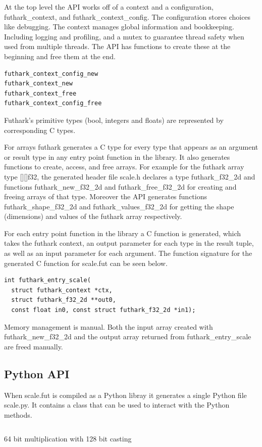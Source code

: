 \documentclass[11pt]{book}
\begin{document}
At the top level the API works off of a context and a configuration, futhark\_context, and futhark\_context\_config. The configuration stores choices like debugging. The context manages global information and bookkeeping. Including logging and profiling, and a mutex to guarantee thread safety when used from multiple threads. The API has functions to create these at the beginning and free them at the end. 
\begin{verbatim}
futhark_context_config_new
futhark_context_new
futhark_context_free
futhark_context_config_free
\end{verbatim}

Futhark's primitive types (bool, integers and floats) are represented by corresponding C types.

For arrays futhark generates a C type for every type that appears as an argument or result type in any entry point function in the library. It also generates functions to create, access, and free arrays. For example for the futhark array type [][]f32, the generated header file scale.h declares a type futhark\_f32\_2d and functions futhark\_new\_f32\_2d and futhark\_free\_f32\_2d for creating and freeing arrays of that type. Moreover the API generates functions futhark\_shape\_f32\_2d and futhark\_values\_f32\_2d for getting the shape (dimensions) and values of the futhark array respectively. 

For each entry point function in the library a C function is generated, which takes the futhark context, an output parameter for each type in the result tuple, as well as an input parameter for each argument. The function signature for the generated C function for scale.fut can be seen below.
\begin{verbatim}
int futhark_entry_scale(
  struct futhark_context *ctx,
  struct futhark_f32_2d **out0,
  const float in0, const struct futhark_f32_2d *in1);
\end{verbatim}

Memory management is manual. Both the input array created with futhark\_new\_f32\_2d and the output array returned from futhark\_entry\_scale are freed manually.

\subsection{Python API}

When scale.fut is compiled as a Python libray it generates a single Python file scale.py. It contains a class that can be used to interact with the Python methods.
\begin{listing}[H] 
        \inputminted[fontsize=\small,baselinestretch=0.5,linenos]{C}{code/compiler/api_examples/example.py}
        \caption{64 bit multiplication with 128 bit casting}
        \label{lst:int128}    
\end{listing} 
\end{document}
